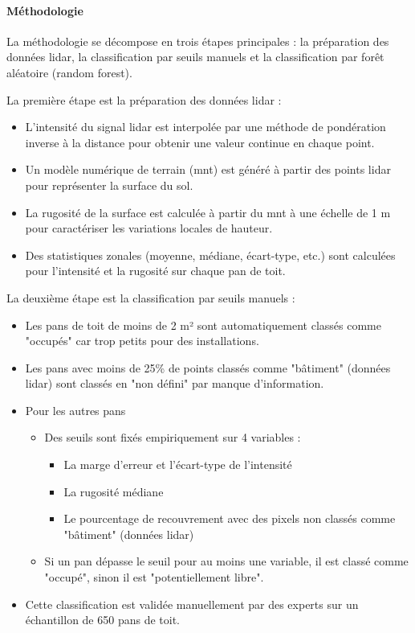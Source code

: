 \paragraph{Méthodologie}
\par{La méthodologie se décompose en trois étapes principales : la préparation des données \gls{lidar}, la classification par seuils manuels et la classification par forêt aléatoire (random forest).}
\par{La première étape est la préparation des données \gls{lidar} :}
\begin{itemize}
    \item L'intensité du signal \gls{lidar} est interpolée par une méthode de pondération inverse à la distance pour obtenir une valeur continue en chaque point.
    \item Un modèle numérique de terrain (\acrshort{mnt}) est généré à partir des points \gls{lidar} pour représenter la surface du sol.
    \item La rugosité de la surface est calculée à partir du \acrshort{mnt} à une échelle de 1 m pour caractériser les variations locales de hauteur.
    \item Des statistiques zonales (moyenne, médiane, écart-type, etc.) sont calculées pour l'intensité et la rugosité sur chaque pan de toit.
\end{itemize}
\par{La deuxième étape est la classification par seuils manuels :}
\begin{itemize}
    \item Les pans de toit de moins de 2 m² sont automatiquement classés comme "occupés" car trop petits pour des installations.
    \item Les pans avec moins de 25\% de points classés comme "bâtiment" (données \gls{lidar}) sont classés en "non défini" par manque d'information.
    \item Pour les autres pans
    \begin{itemize}
        \item Des seuils sont fixés empiriquement sur 4 variables :
        \begin{itemize}
            \item La marge d'erreur et l'écart-type de l'intensité
            \item La rugosité médiane
            \item Le pourcentage de recouvrement avec des pixels non classés comme "bâtiment" (données \gls{lidar})
        \end{itemize}
        \item Si un pan dépasse le seuil pour au moins une variable, il est classé comme "occupé", sinon il est "potentiellement libre".
    \end{itemize}
    \item Cette classification est validée manuellement par des experts sur un échantillon de 650 pans de toit.
\end{itemize}

